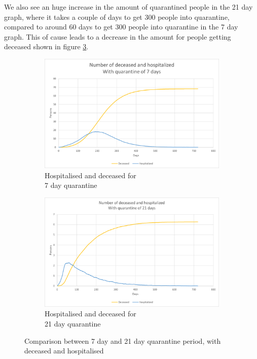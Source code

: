 We also see an huge increase in the amount of quarantined people in the 21 day graph, where it takes a couple of days to get 300 people into quarantine, compared to around 60 days to get 300 people into quarantine in the 7 day graph. This of cause leads to a decrease in the amount for people getting deceased shown in figure \ref{fig:CT_HOS}.

\begin{figure}[H]
\centering
\begin{subfigure}{.5\textwidth}
  \centering
  \includegraphics[width=.95\linewidth]{0_billeder/CT_HOS_7.png}
  \caption{Hospitalised and deceased for \\7 day quarantine}
  \label{fig:CT_HOS_7}
\end{subfigure}%
\begin{subfigure}{.5\textwidth}
  \centering
  \includegraphics[width=.95\linewidth]{0_billeder/CT_HOS_21.png}
  \caption{Hospitalised and deceased for \\21 day quarantine}
  \label{fig:CT_HOS_21}
\end{subfigure}
\caption{Comparison between 7 day and 21 day quarantine period, with deceased and hospitalised}
\label{fig:CT_HOS}
\end{figure}

